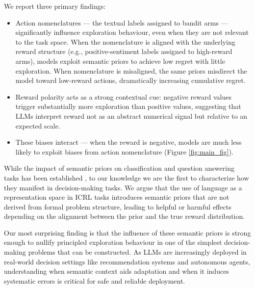 \documentclass{article} %
\begin{document}

We report three primary findings:
\begin{itemize}
    \item Action nomenclatures --- the textual labels assigned to bandit arms --- significantly influence exploration behaviour, even when they are not relevant to the task space. When the nomenclature is aligned with the underlying reward structure (e.g., positive-sentiment labels assigned to high-reward arms), models exploit semantic priors to achieve low regret with little exploration. When nomenclature is misaligned, the same priors misdirect the model toward low-reward actions, dramatically increasing cumulative regret.
    \item Reward polarity acts as a strong contextual cue: negative reward values trigger substantially more exploration than positive values, suggesting that LLMs interpret reward not as an abstract numerical signal but relative to an expected scale.
    \item These biases interact --- when the reward is negative, models are much less likely to exploit biases from action nomenclature (Figure \ref{fig:main_fig}).
\end{itemize}  

While the impact of semantic priors on classification and question answering tasks has been established \citep{jiang-etal-2024-peek, mirzadeh2025gsmsymbolic, cheng-etal-2025-stochastic, shojaee2025the}, to our knowledge we are the first to characterize how they manifest in decision-making tasks. We argue that the use of language as a representation space in ICRL tasks introduces semantic priors that are not derived from formal problem structure, leading to helpful or harmful effects depending on the alignment between the prior and the true reward distribution. 

Our most surprising finding is that the influence of these semantic priors is strong enough to nullify principled exploration behaviour in one of the simplest decision-making problems that can be constructed. As LLMs are increasingly deployed in real-world decision settings like recommendation systems and autonomous agents, understanding when semantic context aids adaptation and when it induces systematic errors is critical for safe and reliable deployment.
\end{document}
